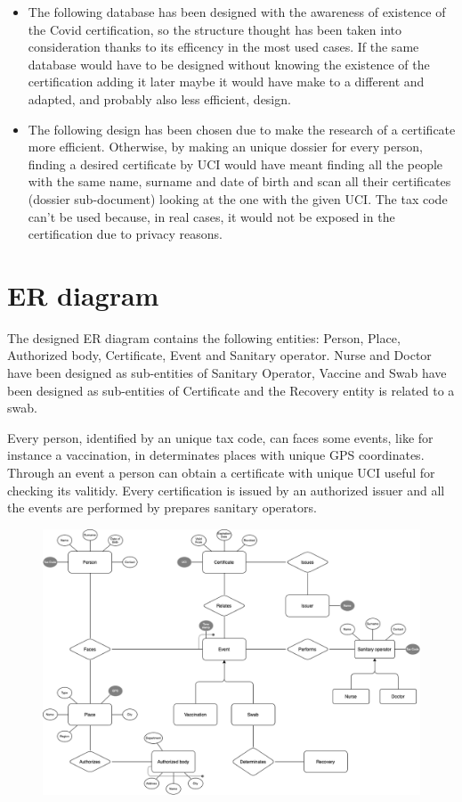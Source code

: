 \documentclass{article}
\begin{document}
\begin{itemize}
\item The following database has been designed with the awareness of existence of the Covid certification, so the structure thought has been taken into consideration thanks to its efficency in the most used cases. If the same database would have to be designed without knowing the existence of the certification adding it later maybe it would have make to a different and adapted, and probably also less efficient, design.
\item The following design has been chosen due to make the research of a certificate more efficient. Otherwise, by making an unique dossier for every person, finding a desired certificate by UCI would have meant finding all the people with the same name, surname and date of birth and scan all their certificates (dossier sub-document) looking at the one with the given UCI. The tax code can't be used because, in real cases, it would not be exposed in the certification due to privacy reasons.

\end{itemize}
\newpage
\section{ER diagram}
The designed ER diagram contains the following entities: Person, Place, Authorized body, Certificate, Event and Sanitary operator. Nurse and Doctor have been designed as sub-entities of Sanitary Operator, Vaccine and Swab have been designed as sub-entities of Certificate and the Recovery entity is related to a swab.

Every person, identified by an unique tax code, can faces some events, like for instance a vaccination, in determinates places with unique GPS coordinates. Through an event a person can obtain a certificate with unique UCI useful for checking its valitidy. Every certification is issued by an authorized issuer and all the events are performed by prepares sanitary operators.

\hfill\break
\hfill\break
\hfill\break


\begin{figure}[h!]
\centering
\includegraphics[scale=0.30]{er.png}
\end{figure}
\newpage
\end{document}
